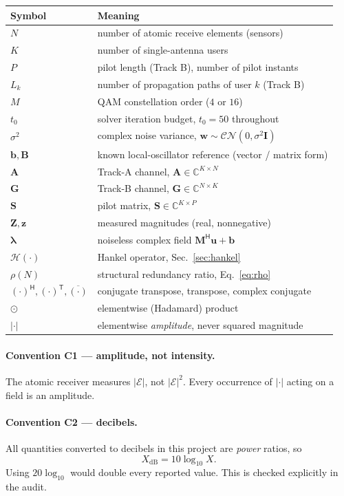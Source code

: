 \documentclass[11pt,a4paper]{article}
\newcommand{\C}{\mathbb{C}}
\newcommand{\CN}{\mathcal{CN}}
\newcommand{\herm}{\mathsf{H}}
\newcommand{\trans}{\mathsf{T}}
\newcommand{\mat}[1]{\mathbf{#1}}
\newcommand{\vect}[1]{\mathbf{#1}}
\newcommand{\Hop}{\mathcal{H}}
\newcommand{\dB}{\mathrm{dB}}
\begin{document}
\begin{longtable}{@{}ll@{}}
\toprule
\textbf{Symbol} & \textbf{Meaning}\\
\midrule
\endhead
$N$ & number of atomic receive elements (sensors)\\
$K$ & number of single-antenna users\\
$P$ & pilot length (Track B), number of pilot instants\\
$L_k$ & number of propagation paths of user $k$ (Track B)\\
$M$ & QAM constellation order ($4$ or $16$)\\
$t_0$ & solver iteration budget, $t_0 = 50$ throughout\\
$\sigma^2$ & complex noise variance, $\vect{w}\sim\CN(0,\sigma^2\mat{I})$\\
$\vect{b},\mat{B}$ & known local-oscillator reference (vector / matrix form)\\
$\mat{A}$ & Track-A channel, $\mat{A}\in\C^{K\times N}$\\
$\mat{G}$ & Track-B channel, $\mat{G}\in\C^{N\times K}$\\
$\mat{S}$ & pilot matrix, $\mat{S}\in\C^{K\times P}$\\
$\mat{Z},\vect{z}$ & measured magnitudes (real, nonnegative)\\
$\boldsymbol{\lambda}$ & noiseless complex field $\mat{M}^{\herm}\vect{u}+\vect{b}$\\
$\Hop(\cdot)$ & Hankel operator, Sec.~\ref{sec:hankel}\\
$\rho(N)$ & structural redundancy ratio, Eq.~\eqref{eq:rho}\\
$(\cdot)^{\herm},(\cdot)^{\trans},\overline{(\cdot)}$ & conjugate transpose, transpose, complex conjugate\\
$\odot$ & elementwise (Hadamard) product\\
$|\cdot|$ & elementwise \emph{amplitude}, never squared magnitude\\
\bottomrule
\end{longtable}

\paragraph{Convention C1 --- amplitude, not intensity.}
The atomic receiver measures $|\mathcal{E}|$, not $|\mathcal{E}|^2$. Every
occurrence of $|\cdot|$ acting on a field is an amplitude.

\paragraph{Convention C2 --- decibels.}
All quantities converted to decibels in this project are \emph{power} ratios,
so
\begin{equation}
X_{\dB} = 10\log_{10} X .
\label{eq:db}
\end{equation}
Using $20\log_{10}$ would double every reported value. This is checked
explicitly in the audit.
\end{document}
